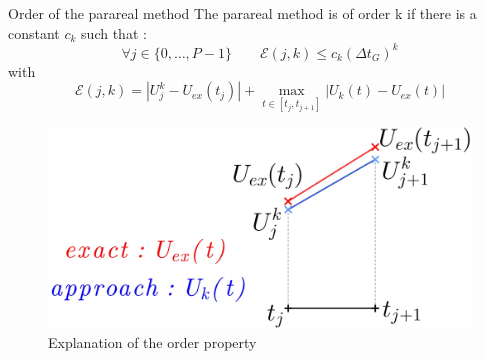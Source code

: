 \begin{frame}{Order of the parareal method}
	The parareal method is of order k if there is a constant $c_k$ such that :
	\begin{equation*}
		\forall j\in\{0,\dots,P-1\} \qquad \mathcal{E}(j,k)\le c_k(\Delta t_G)^k
	\end{equation*}
	with
	$$\mathcal{E}(j,k)=|U_j^k-U_{ex}(t_j)|+\max_{t\in[t_j,t_{j+1}]}|U_k(t)-U_{ex}(t)|$$
	\begin{figure}
		\centering
		\includegraphics[width=0.62\linewidth]{images/parareal/explane_order.jpg}
		\caption{Explanation of the order property}
	\end{figure}
\end{frame}


